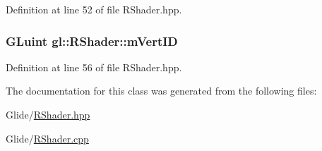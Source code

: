 Definition at line 52 of file R\-Shader.\-hpp.

\hypertarget{classgl_1_1_r_shader_ab0996603afd00f5ce3a6b20479103083}{
\subsubsection[{m\-Vert\-I\-D}]{\setlength{\rightskip}{0pt plus 5cm}G\-Luint gl\-::\-R\-Shader\-::m\-Vert\-I\-D\hspace{0.3cm}{\ttfamily [protected]}}}\label{classgl_1_1_r_shader_ab0996603afd00f5ce3a6b20479103083}


Definition at line 56 of file R\-Shader.\-hpp.



The documentation for this class was generated from the following files\-:\begin{DoxyCompactItemize}
\item 
Glide/\hyperlink{_r_shader_8hpp}{R\-Shader.\-hpp}\item 
Glide/\hyperlink{_r_shader_8cpp}{R\-Shader.\-cpp}\end{DoxyCompactItemize}
